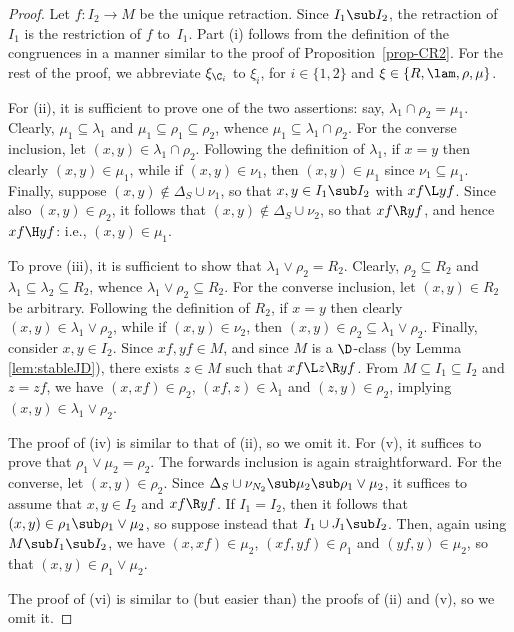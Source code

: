 \begin{proof}
Let $f:I_2\to M$ be the unique retraction.  Since $I_1\sub
  I_2$, the retraction of $I_1$ is the restriction of $f$ to~$I_1$.
  Part (i) follows from the definition of the congruences in a manner
  similar to the proof of Proposition~\ref{prop-CR2}.  For the rest of the proof, we abbreviate $\xi_{\C_i}$ to $\xi_i$, for $i\in\{1,2\}$ and $\xi\in\{R,\lam,\rho,\mu\}$.

For (ii), it is sufficient to prove one of the two assertions: say, $\lambda_1\cap \rho_2=\mu_1$.
Clearly, $\mu_1\subseteq \lambda_1$ and $\mu_1\subseteq \rho_1\subseteq \rho_2$, whence $\mu_1\subseteq \lambda_1\cap\rho_2$.
For the converse inclusion, let $(x,y)\in \lambda_1\cap\rho_2$.
Following the definition of $\lambda_1$, if $x=y$ then clearly $(x,y)\in \mu_1$, while if $(x,y)\in\nu_1$, then $(x,y)\in \mu_1$ since $\nu_1\subseteq\mu_1$.
Finally, suppose $(x,y)\not\in\Delta_S\cup\nu_1$, so that $x,y\in I_1\sub I_2$ with $xf\L yf$.
%
Since also $(x,y)\in\rho_2$, it follows that $(x,y)\not\in\Delta_S\cup\nu_2$, so that $xf\R yf$, and hence $xf\H yf$: i.e., $(x,y)\in\mu_1$.

To prove (iii), it is sufficient to show that $\lambda_1\vee\rho_2=R_2$.
Clearly, $\rho_2\subseteq R_2$ and $\lambda_1\subseteq \lambda_2\subseteq R_2$, whence $\lambda_1\vee\rho_2\subseteq R_2$.
For the converse inclusion, let $(x,y)\in R_2$ be arbitrary.
Following the definition of $R_2$, if $x=y$ then clearly $(x,y)\in \lambda_1\vee\rho_2$, while if $(x,y)\in \nu_2$, then
$(x,y)\in \rho_2\subseteq \lambda_1\vee\rho_2$.
Finally, consider $x,y\in I_2$.
Since $xf,yf\in M$, and since $M$ is a ${\D}$-class (by Lemma \ref{lem:stableJD}), there exists
$z\in M$ such that $xf\L z\R yf$.
From $M\subseteq I_1\subseteq I_2$ and $z=zf$, we have $(x,xf)\in\rho_2$,
$(xf,z)\in \lambda_1$ and $(z,y)\in \rho_2$, implying $(x,y)\in\lambda_1\vee\rho_2$. %

The proof of (iv) is similar to that of (ii), so we omit it.  For (v), it suffices to prove that $\rho_1\vee\mu_2=\rho_2$.  The forwards inclusion is again straightforward.  For the converse, let $(x,y)\in\rho_2$.  Since $\Delta_S\cup\nu_{N_2}\sub\mu_2\sub\rho_1\vee\mu_2$, it suffices to assume that $x,y\in I_2$ and $xf\R yf$.  If $I_1=I_2$, then it follows that $(x,y)\in\rho_1\sub\rho_1\vee\mu_2$, so suppose instead that $I_1\cup J_1\sub I_2$.  Then, again using $M\sub I_1\sub I_2$, we have $(x,xf)\in\mu_2$, $(xf,yf)\in\rho_1$ and $(yf,y)\in\mu_2$, so that $(x,y)\in\rho_1\vee\mu_2$.

The proof of (vi) is similar to (but easier than) the proofs of (ii) and (v), so we omit it.
\end{proof}

